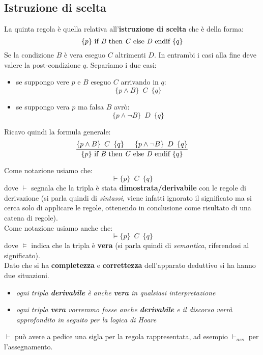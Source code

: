 \subsection{Istruzione di scelta}
\begin{definizione}
	La quinta regola è quella relativa all'\textbf{istruzione di scelta} che è
	della forma:
	\[\{p\}\mbox{ if \textit{B} then \textit{C} else \textit{D} endif }\{q\}\]
	Se la condizione $B$ è vera eseguo $C$ altrimenti $D$. In entrambi i casi
	alla fine deve valere la post-condizione $q$. Separiamo i due casi:
	\begin{itemize}
		\item se suppongo vere $p$ e $B$ eseguo $C$ arrivando in $q$:
		      \[\{p\land B\}\,\,\,C\,\,\,\{q\}\]
		\item se suppongo vera $p$ ma falsa $B$ avrò:
		      \[\{p\land \neg B\}\,\,\,D\,\,\,\{q\}\]
	\end{itemize}
	Ricavo quindi la formula generale:
	\begin{align}\label{ChooseRule}
		\frac{\{p\land B\}\,\,\,C\,\,\,\{q\}\,\,\,\,\,\,\,\,\,         
		\{p\land \neg B\}\,\,\,D\,\,\,\{q\}}{\{p\}\mbox{ if \textit{B} 
		then \textit{C} else \textit{D} endif }\{q\}}                  
	\end{align}
\end{definizione}
\begin{shaded}
	Come notazione usiamo che:
	\[\vdash \{p\}\,\,\,C\,\,\,\{q\}\]
	dove $\vdash$
	segnala che la tripla è stata \textbf{dimostrata/derivabile} con le regole di
	derivazione (si parla quindi di \textit{sintassi}, viene infatti ignorato il
	significato ma si cerca solo di applicare le regole, ottenendo in conclusione
	come risultato di una catena di regole).\\
	Come notazione usiamo anche che:
	\[\vDash \{p\}\,\,\,C\,\,\,\{q\}\]
	dove $\vDash$
	indica che la tripla è \textbf{vera} (si parla quindi di \textit{semantica},
	riferendosi al significato).\\
	Dato che si ha \textbf{completezza} e \textbf{correttezza} dell'apparato
	deduttivo si ha hanno due situazioni.
	\begin{itemize}
		\item \textit{ogni tripla \textbf{derivabile} è anche \textbf{vera} in
		qualsiasi interpretazione}
		\item \textit{ogni tripla \textbf{vera} vorremmo fosse anche
		      \textbf{derivabile} e il discorso verrà approfondito in seguito per la
		logica di Hoare}
	\end{itemize}
	$\vdash$ può avere a pedice una sigla per la regola rappresentata, ad esempio
	$\vdash_{ass}$ per l'assegnamento.
\end{shaded}
